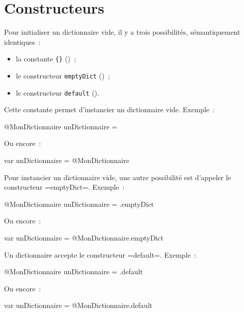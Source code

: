 \section{Constructeurs}

Pour initialiser un dictionnaire vide, il y a trois possibilités, sémantiquement identiques~:
\begin{itemize}
  \item la constante \texttt{\{\}} ()~; 
  \item le constructeur \texttt{emptyDict} ()~; 
  \item le constructeur \texttt{default} (). 
\end{itemize}



Cette constante permet d'instancier un dictionnaire vide. Exemple~:
\begin{galgas}
@MonDictionnaire unDictionnaire = {}
\end{galgas}

Ou encore~:

\begin{galgas}
var unDictionnaire = @MonDictionnaire {}
\end{galgas}


Pour instancier un dictionnaire vide, une autre possibilité est d'appeler le constructeur \ggs=emptyDict=. Exemple~:
\begin{galgas}
@MonDictionnaire unDictionnaire = .emptyDict
\end{galgas}

Ou encore~:

\begin{galgas}
var unDictionnaire = @MonDictionnaire.emptyDict
\end{galgas}

 



Un dictionnaire accepte le constructeur \ggs=default=. Exemple~:
\begin{galgas}
@MonDictionnaire unDictionnaire = .default
\end{galgas}

Ou encore~:

\begin{galgas}
var unDictionnaire = @MonDictionnaire.default
\end{galgas}

